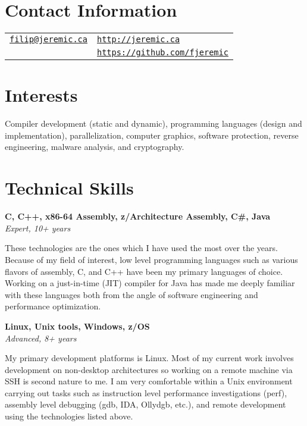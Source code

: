\documentclass[margin,line]{res}
\begin{document}

\begin{resume}
\section{\sc Contact Information}

\vspace{.05in}

\begin{tabular}{@{}p{3.36in}p{3in}}
\href{mailto:filip@jeremic.ca}{\texttt{filip@jeremic.ca}} & \href{http://jeremic.ca}{\texttt{http://jeremic.ca}} \\
& \href{https://github.com/fjeremic}{\texttt{https://github.com/fjeremic}}
\end{tabular}

\section{\sc Interests}

Compiler development (static and dynamic), programming languages (design and implementation), parallelization, computer
graphics, software protection, reverse engineering, malware analysis, and cryptography.

\section{\sc Technical \newline Skills}

{\bf C, C++, x86-64 Assembly, z/Architecture Assembly, C\#, Java} \\
{\em Expert, 10+ years}

These technologies are the ones which I have used the most over the years. Because of my field of interest, low level
programming languages such as various flavors of assembly, C, and C++ have been my primary languages of choice.
Working on a just-in-time (JIT) compiler for Java has made me deeply familiar with these languages both
from the angle of software engineering and performance optimization.

{\bf Linux, Unix tools, Windows, z/OS } \\
{\em Advanced, 8+ years}

My primary development platforms is Linux. Most of my current work involves development on non-desktop
architectures so working on a remote machine via SSH is second nature to me. I am very comfortable within a Unix
environment carrying out tasks such as instruction level performance investigations (perf), assembly level debugging 
(gdb, IDA, Ollydgb, etc.), and remote development using the technologies listed above.


\end{resume}
\end{document}
